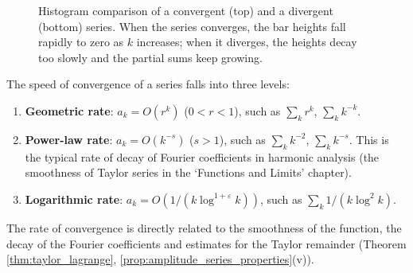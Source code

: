 \begin{figure}[htbp]
\centering
{}
\caption{Histogram comparison of a convergent (top) and a divergent (bottom) series. When the series converges, the bar heights fall rapidly to zero as $k$ increases; when it diverges, the heights decay too slowly and the partial sums keep growing.}
\label{fig:series_convergence_intuition}
\end{figure}

\begin{remark}\label{rem:convergence_speed_hierarchy}
The speed of convergence of a series falls into three levels:
\begin{enumerate}[label=(\roman*)]
  \item \textbf{Geometric rate}: $a_k = O(r^k)$ ($0 < r < 1$), such as $\sum_k r^k$, $\sum_k k^{-k}$.
  \item \textbf{Power-law rate}: $a_k = O(k^{-s})$ ($s > 1$), such as $\sum_k k^{-2}$, $\sum_k k^{-s}$. This is the typical rate of decay of Fourier coefficients in harmonic analysis (the smoothness of Taylor series in the `Functions and Limits' chapter).
  \item \textbf{Logarithmic rate}: $a_k = O(1/(k \log^{1+\varepsilon} k))$, such as $\sum_k 1/(k \log^2 k)$.
\end{enumerate}
The rate of convergence is directly related to the smoothness of the function, the decay of the Fourier coefficients and estimates for the Taylor remainder (Theorem \ref{thm:taylor_lagrange}, \cref{prop:amplitude_series_properties}(v)).
\end{remark}

